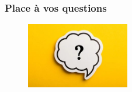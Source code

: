 \documentclass[aspectratio=169]{beamer}
\begin{document}
    \begin{frame}
        \centering
        \frametitle{Place à vos questions}
        \begin{figure}[h]
            \centering
            \includegraphics[width=0.4\textwidth]{imgs/question-mark-speech-bubble-isolated-260}\label{fig:figure3}
        \end{figure}
    \end{frame}
\end{document}

